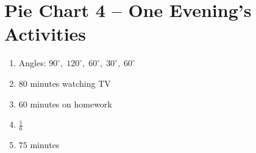 \documentclass[a4paper,12pt]{article}
\begin{document}
\section*{Pie Chart 4 -- One Evening's Activities}

\begin{enumerate}[leftmargin=1.6em, itemsep=2pt]
  \item Angles: \(90^\circ,\;120^\circ,\;60^\circ,\;30^\circ,\;60^\circ\)
  \item \(80\) minutes watching TV
  \item \(60\) minutes on homework
  \item \(\boxed{\frac16}\)
  \item \(75\) minutes
\end{enumerate}
\end{document}
